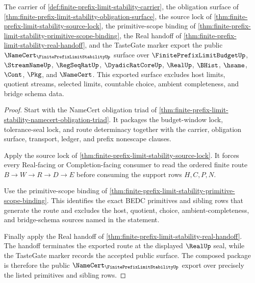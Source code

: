 \begin{theorem}
\label{thm:finite-prefix-limit-stability-public-namecert-export}
The carrier of \autoref{def:finite-prefix-limit-stability-carrier}, the obligation surface of \autoref{thm:finite-prefix-limit-stability-obligation-surface}, the source lock of \autoref{thm:finite-prefix-limit-stability-source-lock}, the primitive-scope binding of \autoref{thm:finite-prefix-limit-stability-primitive-scope-binding}, the Real handoff of \autoref{thm:finite-prefix-limit-stability-real-handoff}, and the TasteGate marker export the public $\NameCert_{\FinitePrefixLimitStabilityUp}$ surface over $\FinitePrefixLimitBudgetUp$, $\StreamNameUp$, $\RegSeqRatUp$, $\DyadicRatCoreUp$, $\RealUp$, $\BHist$, $\hsame$, $\Cont$, $\Pkg$, and $\NameCert$. This exported surface excludes host limits, quotient streams, selected limits, countable choice, ambient completeness, and bridge schema data.
\end{theorem}
\begin{proof}
Start with the NameCert obligation triad of \autoref{thm:finite-prefix-limit-stability-namecert-obligation-triad}. It packages the budget-window lock, tolerance-seal lock, and route determinacy together with the carrier, obligation surface, transport, ledger, and prefix nonescape clauses.

Apply the source lock of \autoref{thm:finite-prefix-limit-stability-source-lock}. It forces every Real-facing or Completion-facing consumer to read the ordered finite route $B \to W \to R \to D \to E$ before consuming the support rows $H,C,P,N$.

Use the primitive-scope binding of \autoref{thm:finite-prefix-limit-stability-primitive-scope-binding}. This identifies the exact BEDC primitives and sibling rows that generate the route and excludes the host, quotient, choice, ambient-completeness, and bridge-schema sources named in the statement.

Finally apply the Real handoff of \autoref{thm:finite-prefix-limit-stability-real-handoff}. The handoff terminates the exported route at the displayed $\RealUp$ seal, while the TasteGate marker records the accepted public surface. The composed package is therefore the public $\NameCert_{\FinitePrefixLimitStabilityUp}$ export over precisely the listed primitives and sibling rows.
\end{proof}

